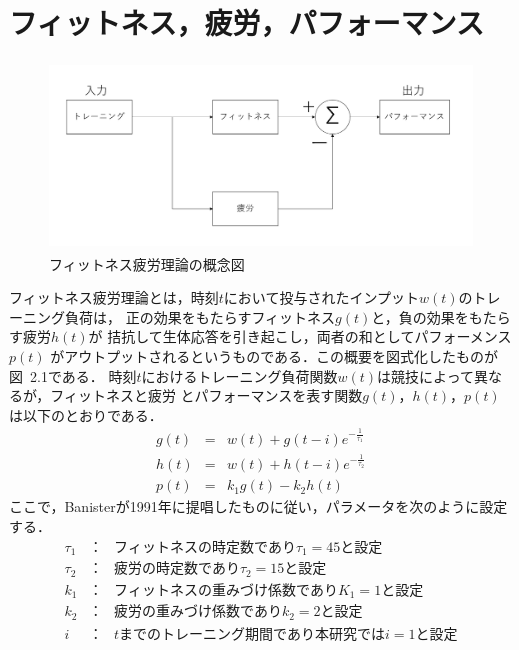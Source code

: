 \documentclass[12pt,fleqn]{jreport}
\begin{document}
\section{フィットネス，疲労，パフォーマンス}
\begin{figure}[h]
  \begin{center}
    \includegraphics[width=15cm,height=5cm]{1.png}
  \end{center}
  \caption{フィットネス疲労理論の概念図}
\end{figure}
フィットネス疲労理論とは，時刻$t$において投与されたインプット$w(t)$のトレーニング負荷は，
正の効果をもたらすフィットネス$g(t)$と，負の効果をもたらす疲労$h(t)$が
拮抗して生体応答を引き起こし，両者の和としてパフォーメンス$p(t)$
がアウトプットされるというものである．この概要を図式化したものが図\ 2.1である．
時刻$t$におけるトレーニング負荷関数$w(t)$は競技によって異なるが，フィットネスと疲労
とパフォーマンスを表す関数$g(t)，h(t)，p(t)$は以下のとおりである．
\begin{eqnarray}
  g(t)&=&w(t)+g(t-i)e^{-\frac{1}{\tau_1}}\label{eq:fit1}\\%
  h(t)&=&w(t)+h(t-i)e^{-\frac{1}{\tau_2}}\label{eq:fig1}\\%
  p(t)&=&k_1g(t)-k_2h(t)\label{eq:per1}%
\end{eqnarray}
ここで，Banister\cite{fitfig}が1991年に提唱したものに従い，パラメータを次のように設定する．
\begin{eqnarray}
  \tau_1&：&フィットネスの時定数であり\tau_1=45と設定\nonumber\\
  \tau_2&：&疲労の時定数であり\tau_2=15と設定\nonumber\\
  k_1&：&フィットネスの重みづけ係数でありK_1=1と設定\nonumber\\
  k_2&：&疲労の重みづけ係数でありk_2=2と設定\nonumber\\
  i&：&tまでのトレーニング期間であり本研究ではi=1と設定\nonumber
\end{eqnarray}
\end{document}
